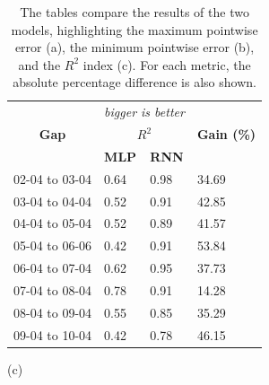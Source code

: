 \begin{table}[H]
	\begin{minipage}{\textwidth}
		\vspace{.1cm}
		\centering
		\begin{tabular}[t]{l|l|l|l}
			\multicolumn{1}{c}{}                          &
			\multicolumn{2}{c}{\textit{bigger is better}} &                                                  \\
			\multicolumn{1}{c|}{\textbf{Gap}}             &
			\multicolumn{2}{c|}{\textbf{$R^2$}}           &
			\multicolumn{1}{c}{\textbf{Gain (\%)}}                                                           \\
			\hline
			                                              & \small \textbf{MLP} & \small\textbf{RNN} &       \\
			\cline{2-3}
			02-04 to 03-04                                & 0.64                & 0.98               & 34.69 \\ %
			03-04 to 04-04                                & 0.52                & 0.91               & 42.85 \\ %
			04-04 to 05-04                                & 0.52                & 0.89               & 41.57 \\%
			05-04 to 06-06                                & 0.42                & 0.91               & 53.84 \\ %
			06-04 to 07-04                                & 0.62                & 0.95               & 37.73 \\ %
			07-04 to 08-04                                & 0.78                & 0.91               & 14.28 \\ %
			08-04 to 09-04                                & 0.55                & 0.85               & 35.29 \\ %
			09-04 to 10-04                                & 0.42                & 0.78               & 46.15 %
		\end{tabular}
		\caption*{(c)}
	\end{minipage}

	\caption{The tables compare the results of the two models, highlighting the maximum pointwise error (a), the minimum pointwise error (b), and the $R^2$ index (c). For each metric, the absolute percentage difference is also shown.}
\end{table}

